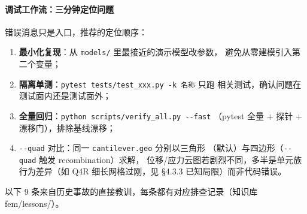 \documentclass[12pt,a4paper]{ctexart}
\newcommand{\fem}{\Verb}
\begin{document}
\paragraph{调试工作流：三分钟定位问题}

错误消息只是入口，推荐的定位顺序：

\begin{enumerate}[leftmargin=*]
  \item \textbf{最小化复现}：从 \fem|models/| 里最接近的演示模型改参数，
        避免从零建模引入第二个变量；
  \item \textbf{隔离单测}：\fem|pytest tests/test_xxx.py -k 名称| 只跑
        相关测试，确认问题在测试面内还是测试面外；
  \item \textbf{全量回归}：\fem|python scripts/verify_all.py --fast|
        （pytest 全量 + 探针 + 漂移门），排除基线漂移；
  \item \fem|--quad| 对比：同一 \fem|cantilever.geo| 分别以三角形
        （默认）与四边形（\fem|--quad| 触发 recombination）求解，
        位移/应力云图若剧烈不同，多半是单元族行为差异（如 Q4R
        细长网格过刚，见 §4.3.3 已知局限）而非代码错误。
\end{enumerate}

以下 9 条来自历史事故的直接教训，每条都有对应排查记录（知识库
fem/lessons/）。
\end{document}
